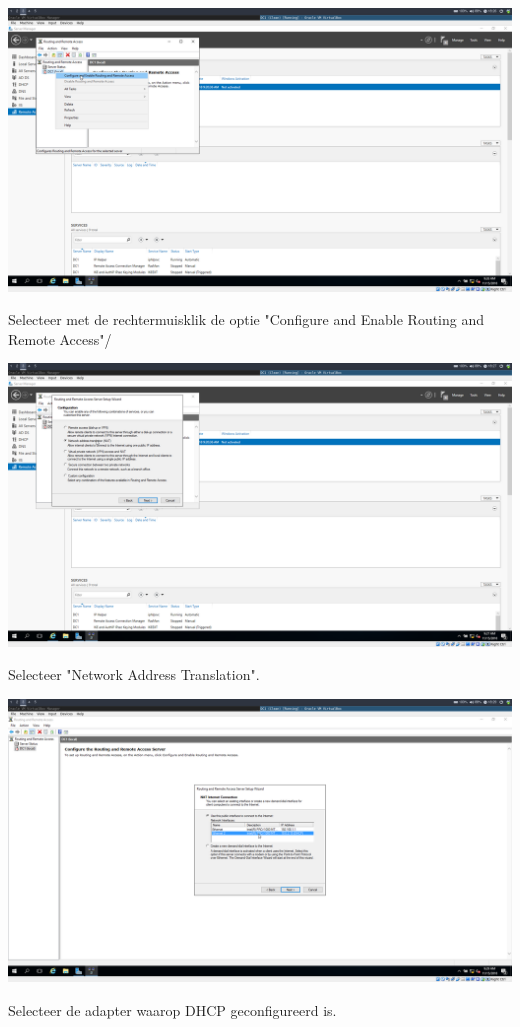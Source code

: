 \documentclass[a4paper]{article}
\begin{document}
\begin{center}
	\includegraphics[width=15cm]{Pictures/DC1/Routing/1542302818.png}
	
	Selecteer met de rechtermuisklik de optie "Configure and Enable Routing and Remote Access"/
\end{center}
\begin{center}
	\includegraphics[width=15cm]{Pictures/DC1/Routing/1542302823.png}
	
	Selecteer "Network Address Translation".
\end{center}
\begin{center}
	\includegraphics[width=15cm]{Pictures/DC1/Routing/1542302956.png}
	
	Selecteer de adapter waarop DHCP geconfigureerd is.
\end{center}
\end{document}
